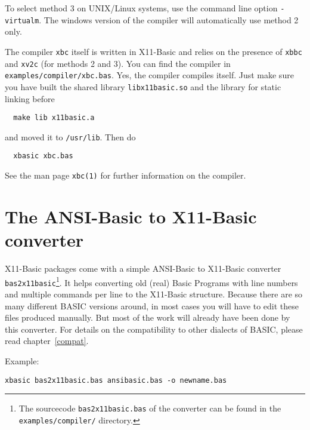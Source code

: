 To select method 3 on UNIX/Linux systems, use the command line option 
\verb|-virtualm|. The windows version of the compiler will automatically use
method 2 only.

The compiler \verb|xbc| itself is written in X11-Basic and relies on the
presence of \verb|xbbc| and \verb|xv2c| (for methods 2 and 3).
You can find the compiler in \verb|examples/compiler/xbc.bas|. 
Yes, the compiler compiles itself. Just make sure you have built the shared 
library \verb|libx11basic.so| and the library for static linking before  
\begin{mdframed}[hidealllines=true,backgroundcolor=black!20]
\begin{verbatim}
  make lib x11basic.a
\end{verbatim}
\end{mdframed}
and moved it to \verb|/usr/lib|. Then do
\begin{mdframed}[hidealllines=true,backgroundcolor=black!20]
\begin{verbatim}
  xbasic xbc.bas
\end{verbatim}
\end{mdframed}
See the man page \verb|xbc(1)| for further information on the compiler.




\section{The ANSI-Basic to X11-Basic converter}

X11-Basic packages come with a simple ANSI-Basic to X11-Basic converter 
\verb|bas2x11basic|\footnote{The sourcecode {\tt bas2x11basic.bas} of the 
converter can be found in the {\tt examples/compiler/} directory.}.
It helps converting old (real) Basic Programs with line numbers and multiple
commands per line to the X11-Basic structure.  Because there are so many
different BASIC versions around, in most cases you will have to edit these
files produced manually. But most of the work will already  have been done by
this converter. For details on the compatibility to other dialects of BASIC, 
please read chapter~\ref{compat}.

Example:
\begin{mdframed}[hidealllines=true,backgroundcolor=black!20]
\begin{verbatim}
xbasic bas2x11basic.bas ansibasic.bas -o newname.bas
\end{verbatim}
\end{mdframed}

